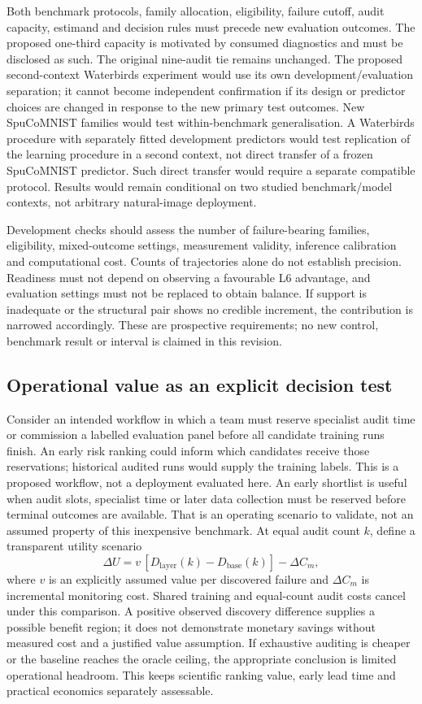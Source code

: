 \documentclass[nolineno]{ieeeaccess}
\begin{document}
Both benchmark protocols, family allocation, eligibility, failure cutoff, audit capacity, estimand and decision rules must precede new evaluation outcomes. The proposed one-third capacity is motivated by consumed diagnostics and must be disclosed as such. The original nine-audit tie remains unchanged. The proposed second-context Waterbirds experiment would use its own development/evaluation separation; it cannot become independent confirmation if its design or predictor choices are changed in response to the new primary test outcomes. New SpuCoMNIST families would test within-benchmark generalisation. A Waterbirds procedure with separately fitted development predictors would test replication of the learning procedure in a second context, not direct transfer of a frozen SpuCoMNIST predictor. Such direct transfer would require a separate compatible protocol. Results would remain conditional on two studied benchmark/model contexts, not arbitrary natural-image deployment.

Development checks should assess the number of failure-bearing families, eligibility, mixed-outcome settings, measurement validity, inference calibration and computational cost. Counts of trajectories alone do not establish precision. Readiness must not depend on observing a favourable L6 advantage, and evaluation settings must not be replaced to obtain balance. If support is inadequate or the structural pair shows no credible increment, the contribution is narrowed accordingly. These are prospective requirements; no new control, benchmark result or interval is claimed in this revision.

\subsection{Operational value as an explicit decision test}
Consider an intended workflow in which a team must reserve specialist audit time or commission a labelled evaluation panel before all candidate training runs finish. An early risk ranking could inform which candidates receive those reservations; historical audited runs would supply the training labels. This is a proposed workflow, not a deployment evaluated here. An early shortlist is useful when audit slots, specialist time or later data collection must be reserved before terminal outcomes are available. That is an operating scenario to validate, not an assumed property of this inexpensive benchmark. At equal audit count $k$, define a transparent utility scenario
\begin{equation}
\Delta U=v\,[D_{\mathrm{layer}}(k)-D_{\mathrm{base}}(k)]-\Delta C_m,
\end{equation}
where $v$ is an explicitly assumed value per discovered failure and $\Delta C_m$ is incremental monitoring cost. Shared training and equal-count audit costs cancel under this comparison. A positive observed discovery difference supplies a possible benefit region; it does not demonstrate monetary savings without measured cost and a justified value assumption. If exhaustive auditing is cheaper or the baseline reaches the oracle ceiling, the appropriate conclusion is limited operational headroom. This keeps scientific ranking value, early lead time and practical economics separately assessable.
\end{document}
